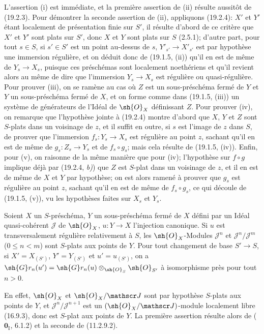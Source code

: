 L'assertion (i) est immédiate, et la première assertion de (ii) résulte aussitôt de (19.2.3). Pour démontrer la seconde assertion de (ii), appliquons (19.2.4): $X'$ et $Y'$ étant localement de présentation finie sur $S'$, il résulte d'abord de ce critère que $X'$ et $Y'$ sont plats sur $S'$, donc $X$ et $Y$ sont plats sur $S$ (2.5.1); d'autre part, pour tout $s\in S$, si $s'\in S'$ est un point au-dessus de $s$, $Y'_{s'}\to X'_{s'}$ est par hypothèse une immersion régulière, et on déduit donc de (19.1.5, (ii)) qu'il en est de même de $Y_s\to X_s$, puisque ces préschémas sont localement noethériens et qu'il revient alors au même de dire que l'immersion $Y_s\to X_s$ est régulière ou quasi-régulière. Pour prouver (iii), on se ramène au cas où $Z$ est un sous-préschéma fermé de $Y$ et $Y$ un sous-préschéma fermé de $X$, et on forme comme dans (19.1.5, (iii)) un système de générateurs de l'Idéal de $\sh{O}_X$ définissant $Z$. Pour prouver (iv), on remarque que l'hypothèse jointe à (19.2.4) montre d'abord que $X$, $Y$ et $Z$ sont $S$-plats dans un voisinage de $z$, et il suffit en outre, si $s$ est l'image de $z$ dans $S$, de prouver que l'immersion $f_s:Y_s\to X_s$ est régulière au point $z$, sachant qu'il en est de même de $g_s:Z_s\to Y_s$ et de $f_s\circ g_s$; mais cela résulte de (19.1.5, (iv)). Enfin, pour (v), on raisonne de la même manière que pour (iv); l'hypothèse sur $f\circ g$ implique déjà par (19.2.4, \emph{b)}) que $Z$ est $S$-plat dans un voisinage de $z$, et il en est de même de $X$ et $Y$ par hypothèse; on est alors ramené à prouver que $g_s$ est régulière au point $z$, sachant qu'il en est de même de $f_s\circ g_s$, ce qui découle de (19.1.5, (v)), vu les hypothèses faites sur $X_s$ et $Y_s$.


\begin{proposition}[19.2.8]
\label{IV.19.2.8}
Soient $X$ un $S$-préschéma, $Y$ un sous-préschéma fermé de $X$ défini par un Idéal quasi-cohérent $\mathscr J$ de $\sh{O}_X$, $u:Y\to X$ l'injection canonique. Si $u$ est transversalement régulière relativement à $S$, les $\sh{O}_X$-Modules $\mathscr J^n$ et $\mathscr J^n/\mathscr J^m$ \textup{(}$0\leq n<m$\textup{)} sont $S$-plats aux points de $Y$. Pour tout changement de base $S'\to S$, si $X'=X_{(S')}$, $Y'=Y_{(S')}$ et $u'=u_{(S')}$, on a $\sh{G}r_n(u')=\sh{G}r_n(u)\otimes_{\sh{O}_S}\sh{O}_{S'}$ à isomorphisme près pour tout $n>0$.
\end{proposition}

En effet, $\sh{O}_X$ et $\sh{O}_X/\mathscr J$ sont par hypothèse $S$-plats aux points de $Y$, et $\mathscr J^n/\mathscr J^{n+1}$ est un $(\sh{O}_X/\mathscr J)$-module localement libre (16.9.3), donc est $S$-plat aux points de $Y$. La première assertion résulte alors de ($\mathbf{0}_{\mathrm I}$, 6.1.2) et la seconde de (11.2.9.2).

